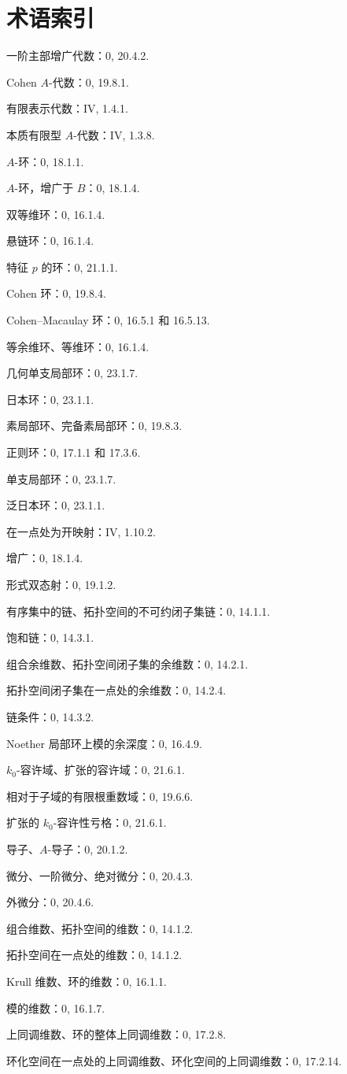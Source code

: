 \clearpage
{}
{}
\section*{术语索引}

一阶主部增广代数：0, 20.4.2.\par
Cohen $A$-代数：0, 19.8.1.\par
有限表示代数：IV, 1.4.1.\par
本质有限型 $A$-代数：IV, 1.3.8.\par
$A$-环：0, 18.1.1.\par
$A$-环，增广于 $B$：0, 18.1.4.\par
双等维环：0, 16.1.4.\par
悬链环：0, 16.1.4.\par
特征 $p$ 的环：0, 21.1.1.\par
Cohen 环：0, 19.8.4.\par
Cohen--Macaulay 环：0, 16.5.1 和 16.5.13.\par
等余维环、等维环：0, 16.1.4.\par
几何单支局部环：0, 23.1.7.\par
日本环：0, 23.1.1.\par
素局部环、完备素局部环：0, 19.8.3.\par
正则环：0, 17.1.1 和 17.3.6.\par
单支局部环：0, 23.1.7.\par
泛日本环：0, 23.1.1.\par
在一点处为开映射：IV, 1.10.2.\par
增广：0, 18.1.4.\par

形式双态射：0, 19.1.2.\par

有序集中的链、拓扑空间的不可约闭子集链：0, 14.1.1.\par
饱和链：0, 14.3.1.\par
组合余维数、拓扑空间闭子集的余维数：0, 14.2.1.\par
拓扑空间闭子集在一点处的余维数：0, 14.2.4.\par
链条件：0, 14.3.2.\par
Noether 局部环上模的余深度：0, 16.4.9.\par
$k_0$-容许域、扩张的容许域：0, 21.6.1.\par
相对于子域的有限根重数域：0, 19.6.6.\par

扩张的 $k_0$-容许性亏格：0, 21.6.1.\par
导子、$A$-导子：0, 20.1.2.\par
微分、一阶微分、绝对微分：0, 20.4.3.\par
外微分：0, 20.4.6.\par
组合维数、拓扑空间的维数：0, 14.1.2.\par
拓扑空间在一点处的维数：0, 14.1.2.\par
Krull 维数、环的维数：0, 16.1.1.\par
模的维数：0, 16.1.7.\par
上同调维数、环的整体上同调维数：0, 17.2.8.\par
环化空间在一点处的上同调维数、环化空间的上同调维数：0, 17.2.14.\par

